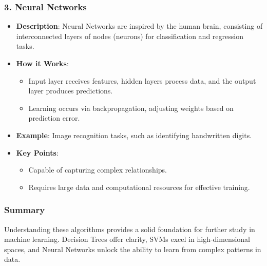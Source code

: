 \documentclass[aspectratio=169]{beamer}
\begin{document}
\begin{frame}[fragile]
    \frametitle{3. Neural Networks}
    \begin{itemize}
        \item \textbf{Description}: Neural Networks are inspired by the human brain, consisting of interconnected layers of nodes (neurons) for classification and regression tasks.
        \item \textbf{How it Works}:
            \begin{itemize}
                \item Input layer receives features, hidden layers process data, and the output layer produces predictions.
                \item Learning occurs via backpropagation, adjusting weights based on prediction error.
            \end{itemize}
        \item \textbf{Example}: Image recognition tasks, such as identifying handwritten digits.
        \item \textbf{Key Points}:
            \begin{itemize}
                \item Capable of capturing complex relationships.
                \item Requires large data and computational resources for effective training.
            \end{itemize}
    \end{itemize}
\end{frame}

\begin{frame}[fragile]
    \frametitle{Summary}
    Understanding these algorithms provides a solid foundation for further study in machine learning. Decision Trees offer clarity, SVMs excel in high-dimensional spaces, and Neural Networks unlock the ability to learn from complex patterns in data.
\end{frame}
\end{document}
